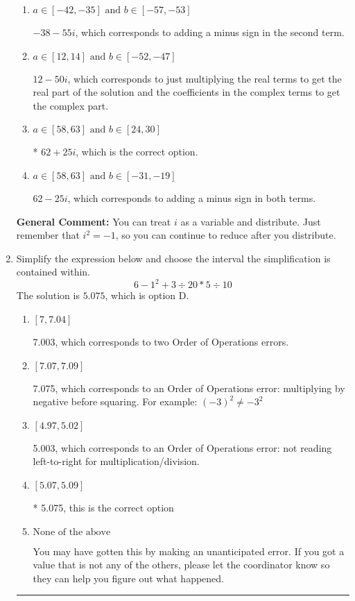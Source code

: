 \documentclass{extbook}[14pt]
\newcommand{\litem}[1]{\item #1

\rule{\textwidth}{0.4pt}}
\begin{document}
\begin{enumerate}
{\begin{enumerate}[label=\Alph*.]
 $-38 + 55 i$, which corresponds to adding a minus sign in the first term.
\item \( a \in [-42, -35] \text{ and } b \in [-57, -53] \)

 $-38 - 55 i$, which corresponds to adding a minus sign in the second term.
\item \( a \in [12, 14] \text{ and } b \in [-52, -47] \)

 $12 - 50 i$, which corresponds to just multiplying the real terms to get the real part of the solution and the coefficients in the complex terms to get the complex part.
\item \( a \in [58, 63] \text{ and } b \in [24, 30] \)

* $62 + 25 i$, which is the correct option.
\item \( a \in [58, 63] \text{ and } b \in [-31, -19] \)

 $62 - 25 i$, which corresponds to adding a minus sign in both terms.
\end{enumerate}

\textbf{General Comment:} You can treat $i$ as a variable and distribute. Just remember that $i^2=-1$, so you can continue to reduce after you distribute.
}
\litem{
Simplify the expression below and choose the interval the simplification is contained within.
\[ 6 - 1^2 + 3 \div 20 * 5 \div 10 \]The solution is \( 5.075 \), which is option D.\begin{enumerate}[label=\Alph*.]
\item \( [7, 7.04] \)

 7.003, which corresponds to two Order of Operations errors.
\item \( [7.07, 7.09] \)

 7.075, which corresponds to an Order of Operations error: multiplying by negative before squaring. For example: $(-3)^2 \neq -3^2$
\item \( [4.97, 5.02] \)

 5.003, which corresponds to an Order of Operations error: not reading left-to-right for multiplication/division.
\item \( [5.07, 5.09] \)

* 5.075, this is the correct option
\item \( \text{None of the above} \)

 You may have gotten this by making an unanticipated error. If you got a value that is not any of the others, please let the coordinator know so they can help you figure out what happened.
\end{enumerate}

}
\end{enumerate}
\end{document}
